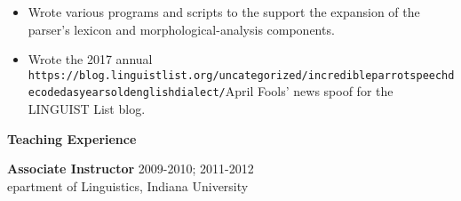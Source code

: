 \begin{singlespace}
\begin{itemize}
\item Wrote various programs and scripts to the support the expansion of the parser's lexicon and morphological-analysis components. 
\item Wrote the 2017 annual \texttt{https://blog.linguistlist.org/uncategorized/incredible\-parrot\-speech\-decoded\-as\-years\-old\-english\-dialect/}{April Fools' news spoof}  for the LINGUIST List blog. %
\end{itemize}
\newpage
\thispagestyle{empty}
\centerline{\textbf{\Large Teaching Experience}}
\vspace{6pt}
\noindent\textbf{Associate Instructor} \hfill 2009-2010; 2011-2012 \\
epartment of Linguistics, Indiana University


\end{singlespace}
